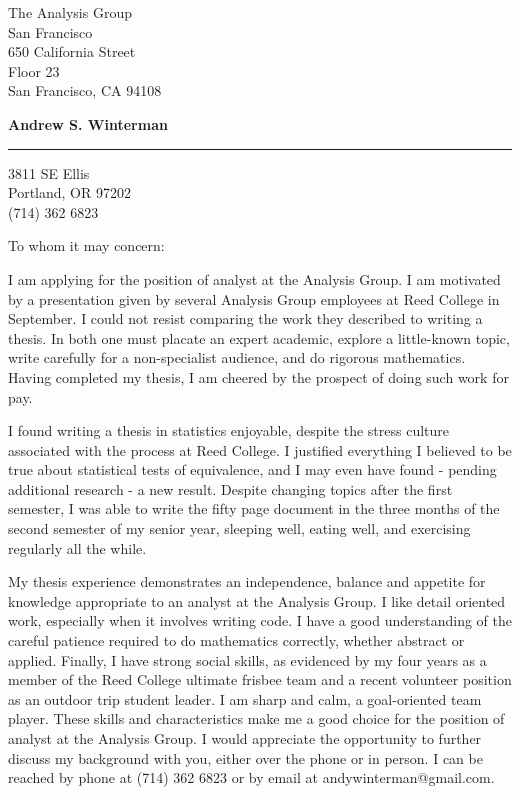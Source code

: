 \documentclass[11pt]{letter} %
\begin{document}
\longindentation=0pt                       %
\let\raggedleft\raggedright                %
 
\begin{letter}{
The Analysis Group \\
San Francisco \\
650 California Street \\
Floor 23\\
San Francisco, CA  94108} 

\begin{center}
\large \bf{Andrew S. Winterman} \end{center}
\medskip\hrule height 1pt
\begin{center}
3811 SE Ellis \\ Portland, OR 97202 \\ (714) 362 6823
\end{center} 


 
\opening{To whom it may concern:} 
 
\noindent I am applying for the position of analyst at the Analysis Group. I am motivated by a presentation given  by several Analysis Group employees at Reed College in September.  %
 I could not resist comparing the work they described to writing a thesis. In both one must placate an expert academic, explore a little-known topic, write carefully for a non-specialist audience, and do rigorous mathematics. Having completed my thesis, I am cheered by the prospect of doing such work for pay.
 
 \noindent I found writing a thesis in statistics enjoyable, despite the stress culture associated with the process at Reed College. I justified everything I believed to be true about statistical tests of equivalence, and I may even have found - pending additional research - a new result. Despite changing topics after the first semester, I was able to write the fifty page document in the three months of the second semester of my senior year, sleeping well, eating well, and exercising regularly all the while. 
 
\noindent My thesis experience demonstrates an independence, balance and appetite for knowledge appropriate to an analyst at the Analysis Group.  I like detail oriented work, especially when it involves writing code. I have a good understanding of the careful patience required to do mathematics correctly, whether abstract or applied. Finally, I have strong social skills, as evidenced by my four years as a member of the Reed College ultimate frisbee team and a recent volunteer position as an outdoor trip student leader. I am sharp and calm, a goal-oriented team player. These skills and characteristics make me a good choice for the position of analyst at the Analysis Group. I would appreciate the opportunity to further discuss my background with you, either over the phone or in person. I can be reached by phone at (714) 362 6823 or by email at andywinterman@gmail.com. %


\end{letter}
\end{document}
